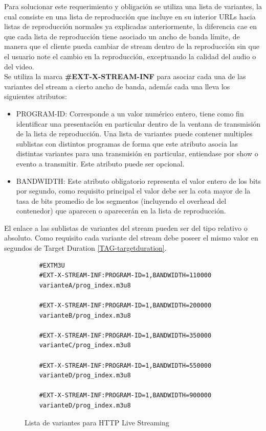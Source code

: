 Para solucionar este requerimiento y obligación se utiliza una lista de variantes, la cual consiste en una lista de reproducción que incluye en su interior URLs hacia listas de reproducción normales ya explicadas anteriormente, la diferencia cae en que cada lista de reproducción tiene asociado un ancho de banda límite, de manera que el cliente pueda cambiar de stream dentro de la reproducción sin que el usuario note el cambio en la reproducción, exceptuando la calidad del audio o del video.\\

Se utiliza la marca \textbf{\#EXT-X-STREAM-INF} para asociar cada una de las variantes del stream a cierto ancho de banda, además cada una lleva los siguientes atributos:

\begin{itemize}

\item PROGRAM-ID: Corresponde a un valor numérico entero, tiene como fin identificar una presentación en particular dentro de la ventana de transmisión de la lista de reproducción. Una lista de variantes puede contener multiples sublistas con distintos programas de forma que este atributo asocia las distintas variantes para una transmisión en particular, entiendase por show o evento a transmitir. Este atributo puede ser opcional.

\item BANDWIDTH: Este atributo obligatorio representa el valor entero de los bits por segundo, como requisito principal el valor debe ser la cota mayor de la tasa de bits promedio de los segmentos (incluyendo el overhead del contenedor) que aparecen o aparecerán en la lista de reproducción. 

\end{itemize}

El enlace a las sublistas de variantes del stream pueden ser del tipo relativo o absoluto. Como requisito cada variante del stream debe poseer el mismo valor en segundos de Target Duration \ref{TAG-targetduration}.

\begin{figure}[H]
	\centering
	\begin{lstlisting}
	#EXTM3U
	#EXT-X-STREAM-INF:PROGRAM-ID=1,BANDWIDTH=110000
	varianteA/prog_index.m3u8
	
	#EXT-X-STREAM-INF:PROGRAM-ID=1,BANDWIDTH=200000
	varianteB/prog_index.m3u8

	#EXT-X-STREAM-INF:PROGRAM-ID=1,BANDWIDTH=350000
	varianteC/prog_index.m3u8

	#EXT-X-STREAM-INF:PROGRAM-ID=1,BANDWIDTH=550000
	varianteD/prog_index.m3u8

	#EXT-X-STREAM-INF:PROGRAM-ID=1,BANDWIDTH=900000
	varianteD/prog_index.m3u8

	\end{lstlisting}
	\caption{Lista de variantes para HTTP Live Streaming}
	\label{ejemploVariantPLS}	
\end{figure}	

